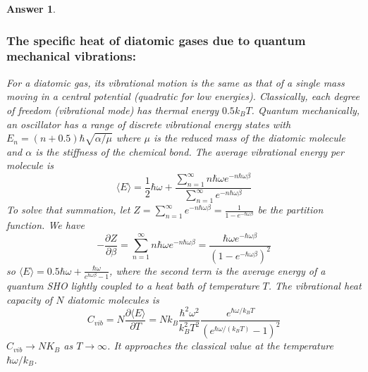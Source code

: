 \documentclass[a4paper]{article}
\newtheorem{ans}{Answer}[subsection]
\theoremstyle{new}
\begin{document}
\begin{ans}
\subsubsection*{The specific heat of diatomic gases due to quantum mechanical vibrations:}
For a diatomic gas, its vibrational motion is the same as that of a single mass moving in a central potential (quadratic for low energies). Classically, each degree of freedom (vibrational mode) has thermal energy $0.5k_BT$. Quantum mechanically, an oscillator has a range of discrete vibrational energy states with $E_n=(n+0.5)\hbar\sqrt{\alpha/\mu}$ where $\mu$ is the reduced mass of the diatomic molecule and $\alpha$ is the stiffness of the chemical bond. The average vibrational energy per molecule is
$$\langle E\rangle=\frac{1}{2}\hbar\omega+\frac{\sum_{n=1}^\infty n\hbar\omega e^{-n\hbar\omega\beta}}{\sum_{n=1}^\infty e^{-n\hbar\omega\beta}}$$
To solve that summation, let $Z=\sum_{n=1}^\infty e^{-n\hbar\omega\beta}=\frac{1}{1-e^{-\hbar\omega\beta}}$ be the partition function. We have
$$-\frac{\partial Z}{\partial\beta}=\sum_{n=1}^\infty n\hbar\omega e^{-n\hbar\omega\beta}=\frac{\hbar\omega e^{-\hbar\omega\beta}}{(1-e^{-\hbar\omega\beta})^2}$$
so $\langle E\rangle=0.5\hbar\omega+\frac{\hbar\omega}{e^{\hbar\omega\beta}-1}$, where the second term is the average energy of a quantum SHO lightly coupled to a heat bath of temperature $T$. The vibrational heat capacity of $N$ diatomic molecules is
$$C_{vib}=N\frac{\partial\langle E\rangle}{\partial T}=Nk_B\frac{\hbar^2\omega^2}{k_B^2T^2}\frac{e^{\hbar\omega/k_BT}}{(e^{\hbar\omega/(k_BT)}-1)^2}$$
$C_{vib}\rightarrow NK_B$ as $T\rightarrow\infty$. It approaches the classical value at the temperature $\hbar\omega/k_B$.
\newpage

\end{ans}
\end{document}
